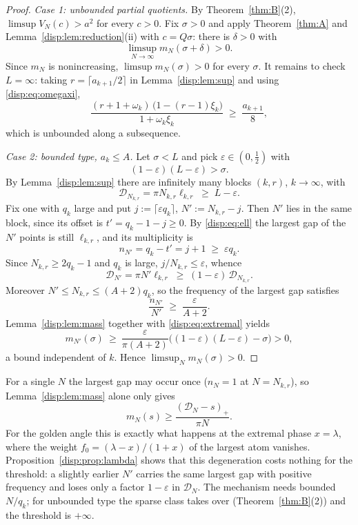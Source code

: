 \begin{proof}
\emph{Case 1: unbounded partial quotients.} By Theorem~\ref{thm:B}(2), $\limsup V_N(c)>a^2$ for every $c>0$. Fix $\sigma>0$ and apply
Theorem~\ref{thm:A} and Lemma~\ref{disp:lem:reduction}(ii) with $c=Q\sigma$: there is $\delta>0$ with
\[
\limsup_{N\to\infty} m_N(\sigma+\delta)>0 .
\]
Since $m_N$ is nonincreasing, $\limsup m_N(\sigma)>0$ for every $\sigma$. It remains to check $L=\infty$: taking $r=\lceil a_{k+1}/2\rceil$
in Lemma~\ref{disp:lem:sup} and using \eqref{disp:eq:omegaxi},
\[
\frac{(r+1+\omega_k)\,\bigl(1-(r-1)\xi_k\bigr)}{1+\omega_k\xi_k}\;\ge\;\frac{a_{k+1}}{8},
\]
which is unbounded along a subsequence.

\emph{Case 2: bounded type, $a_k\le A$.} Let $\sigma<L$ and pick $\varepsilon\in(0,\tfrac12)$ with
\[
(1-\varepsilon)(L-\varepsilon)>\sigma .
\]
By Lemma~\ref{disp:lem:sup} there are infinitely many blocks $(k,r)$, $k\to\infty$, with
\begin{equation}\label{disp:eq:extremal}
\mathcal D_{N_{k,r}}=\pi N_{k,r}\ell_{k,r}\;\ge\;L-\varepsilon .
\end{equation}
Fix one with $q_k$ large and put $j:=\lceil\varepsilon q_k\rceil$, $N':=N_{k,r}-j$.
Then $N'$ lies in the same block, since its offset is $t'=q_k-1-j\ge0$. By \eqref{disp:eq:ell} the largest gap of the $N'$ points is
still $\ell_{k,r}$, and its multiplicity is
\[
n_{N'}=q_k-t'=j+1\;\ge\;\varepsilon q_k .
\]
Since $N_{k,r}\ge2q_k-1$ and $q_k$ is large, $j/N_{k,r}\le\varepsilon$, whence
\[
\mathcal D_{N'}=\pi N'\ell_{k,r}\;\ge\;(1-\varepsilon)\,\mathcal D_{N_{k,r}} .
\]
Moreover $N'\le N_{k,r}\le(A+2)q_k$, so the frequency of the largest gap satisfies
\[
\frac{n_{N'}}{N'}\;\ge\;\frac{\varepsilon}{A+2}.
\]
Lemma~\ref{disp:lem:mass} together with \eqref{disp:eq:extremal} yields
\[
m_{N'}(\sigma)\ \ge\ \frac{\varepsilon}{\pi(A+2)}\bigl((1-\varepsilon)(L-\varepsilon)-\sigma\bigr)>0 ,
\]
a bound independent of $k$. Hence $\limsup_N m_N(\sigma)>0$.
\end{proof}

\begin{remark}\label{disp:rem:conv}
For a single $N$ the largest gap may occur once ($n_N=1$ at $N=N_{k,r}$), so Lemma~\ref{disp:lem:mass} alone only gives
\[
m_N(s)\ge\frac{(\mathcal D_N-s)_+}{\pi N}.
\]
For the golden angle this is exactly what happens at the extremal phase $x=\lambda$, where the weight $f_0=(\lambda-x)/(1+x)$ of the largest atom vanishes.
Proposition~\ref{disp:prop:lambda} shows that this degeneration costs nothing for the threshold: a slightly earlier $N'$ carries the same largest gap with positive
frequency and loses only a factor $1-\varepsilon$ in $\mathcal D_N$. The mechanism needs bounded $N/q_k$; for unbounded type the sparse class takes over (Theorem~\ref{thm:B}(2)) and the threshold is $+\infty$.
\end{remark}

